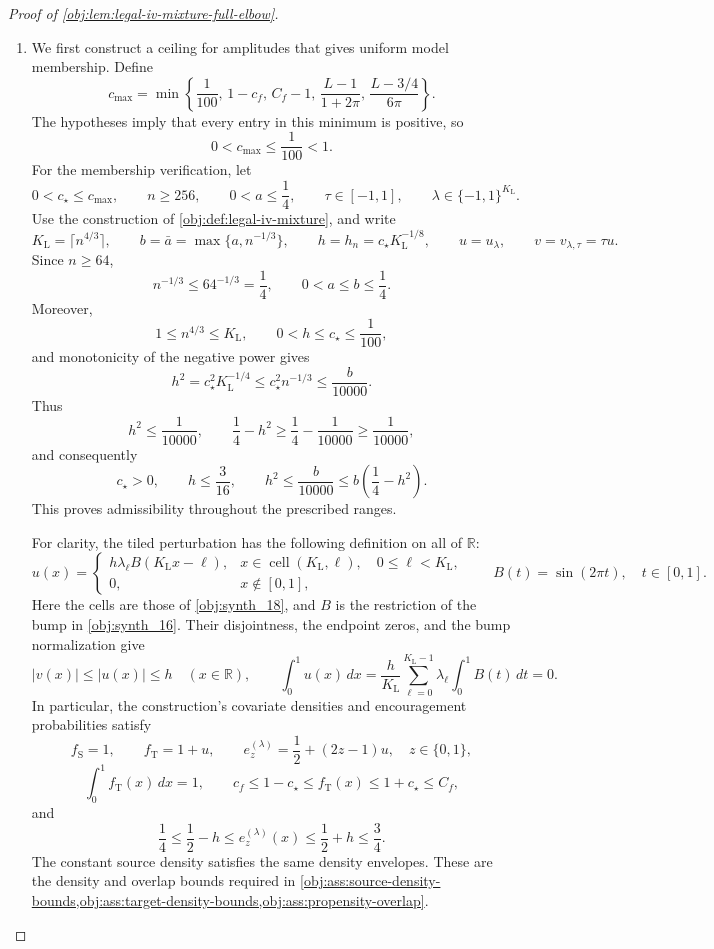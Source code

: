 \documentclass[11pt]{article}
\begin{document}
\begin{proof}[Proof of \cref{obj:lem:legal-iv-mixture-full-elbow}]
\begin{enumerate}
\item
We first construct a ceiling for amplitudes that gives uniform model membership. Define
\[
c_{\max}
=
\min\left\{
\frac1{100},\,
1-c_f,\,
C_f-1,\,
\frac{L-1}{1+2\pi},\,
\frac{L-3/4}{6\pi}
\right\}.
\]
The hypotheses imply that every entry in this minimum is positive, so
\[
0<c_{\max}\le\frac1{100}<1.
\]
For the membership verification, let
\[
0<c_{\star}\le c_{\max},\qquad
n\ge256,\qquad
0<a\le\frac14,\qquad
\tau\in[-1,1],\qquad
\lambda\in\{-1,1\}^{K_{\mathrm L}}.
\]
Use the construction of \cref{obj:def:legal-iv-mixture}, and write
\[
K_{\mathrm L}=\lceil n^{4/3}\rceil,\qquad
b=\bar a=\max\{a,n^{-1/3}\},\qquad
h=h_n=c_{\star}K_{\mathrm L}^{-1/8},\qquad
u=u_{\lambda},\qquad v=v_{\lambda,\tau}=\tau u.
\]
Since \(n\ge64\),
\[
n^{-1/3}\le64^{-1/3}=\frac14,
\qquad
0<a\le b\le\frac14.
\]
Moreover,
\[
1\le n^{4/3}\le K_{\mathrm L},
\qquad
0<h\le c_{\star}\le\frac1{100},
\]
and monotonicity of the negative power gives
\[
h^2=c_{\star}^2K_{\mathrm L}^{-1/4}
\le c_{\star}^2n^{-1/3}
\le\frac{b}{10000}.
\]
Thus
\[
h^2\le\frac1{10000},
\qquad
\frac14-h^2\ge\frac14-\frac1{10000}\ge\frac1{10000},
\]
and consequently
\[
c_{\star}>0,\qquad
h\le\frac3{16},\qquad
h^2\le\frac{b}{10000}
\le b\left(\frac14-h^2\right).
\]
This proves admissibility throughout the prescribed ranges.

For clarity, the tiled perturbation has the following definition on all of \(\mathbb R\):
\[
u(x)=
\begin{cases}
h\lambda_{\ell}B(K_{\mathrm L}x-\ell),
&x\in\operatorname{cell}(K_{\mathrm L},\ell),
\quad 0\le\ell<K_{\mathrm L},\\
0,&x\notin[0,1],
\end{cases}
\qquad
B(t)=\sin(2\pi t),\quad t\in[0,1].
\]
Here the cells are those of \cref{obj:synth_18}, and \(B\) is the restriction of the bump in \cref{obj:synth_16}. Their disjointness, the endpoint zeros, and the bump normalization give
\[
|v(x)|\le |u(x)|\le h
\quad(x\in\mathbb R),
\qquad
\int_0^1u(x)\,dx
=
\frac{h}{K_{\mathrm L}}
\sum_{\ell=0}^{K_{\mathrm L}-1}
\lambda_{\ell}\int_0^1B(t)\,dt
=0.
\]
In particular, the construction's covariate densities and encouragement probabilities satisfy
\[
f_{\mathrm S}=1,\qquad f_{\mathrm T}=1+u,\qquad
e_z^{(\lambda)}=\frac12+(2z-1)u,\quad z\in\{0,1\},
\]
\[
\int_0^1f_{\mathrm T}(x)\,dx=1,
\qquad
c_f\le1-c_{\star}\le f_{\mathrm T}(x)
\le1+c_{\star}\le C_f,
\]
and
\[
\frac14\le\frac12-h
\le e_z^{(\lambda)}(x)
\le\frac12+h\le\frac34.
\]
The constant source density satisfies the same density envelopes. These are the density and overlap bounds required in
\cref{obj:ass:source-density-bounds,obj:ass:target-density-bounds,obj:ass:propensity-overlap}.


\end{enumerate}
\end{proof}
\end{document}
